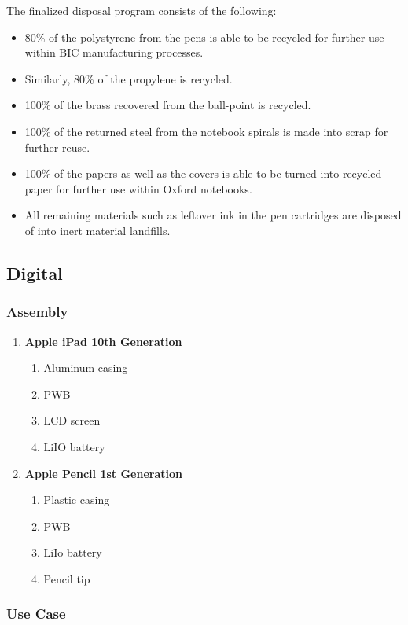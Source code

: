 The finalized disposal program consists of the following:
\begin{itemize}
    \item 80\% of the polystyrene from the pens is able to be recycled for further use within BIC manufacturing processes.
    \item Similarly, 80\% of the propylene is recycled.
    \item 100\% of the brass recovered from the ball-point is recycled.
    \item 100\% of the returned steel from the notebook spirals is made into scrap for further reuse.
    \item 100\% of the papers as well as the covers is able to be turned into recycled paper for further use within Oxford notebooks.
    \item All remaining materials such as leftover ink in the pen cartridges are disposed of into inert material landfills.
\end{itemize}

\subsection{Digital}\label{subsec:digital_scenario}

\subsubsection*{Assembly}
\begin{enumerate}
    \item \textbf{Apple iPad 10th Generation}
    \begin{enumerate}
        \item Aluminum casing
        \item PWB
        \item LCD screen
        \item LiIO battery
    \end{enumerate}
    \item \textbf{Apple Pencil 1st Generation}
    \begin{enumerate}
        \item Plastic casing
        \item PWB
        \item LiIo battery
        \item Pencil tip
    \end{enumerate}
\end{enumerate}

\subsubsection*{Use Case}

